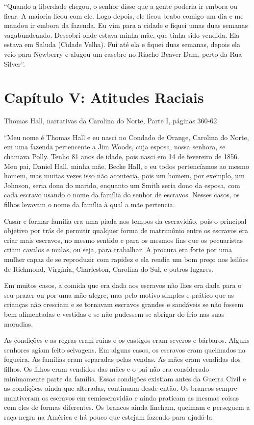 ``Quando a liberdade chegou, o senhor disse que a gente poderia ir
embora ou ficar. A maioria ficou com ele. Logo depois, ele ficou brabo
comigo um dia e me mandou ir embora da fazenda. Eu vim para a cidade e
fiquei umas duas semanas vagabundeando. Descobri onde estava minha mãe,
que tinha sido vendida. Ela estava em Saluda (Cidade Velha). Fui até ela
e fiquei duas semanas, depois ela veio para Newberry e alugou um casebre
no Riacho Beaver Dam, perto da Rua Silver''.

\chapter{Capítulo V: Atitudes Raciais}

Thomas Hall, narrativas da Carolina do Norte, Parte I, páginas 360-62

``Meu nome é Thomas Hall e eu nasci no Condado de Orange, Carolina do
Norte, em uma fazenda pertencente a Jim Woods, cuja esposa, nossa
senhora, se chamava Polly. Tenho 81 anos de idade, pois nasci em 14 de
fevereiro de 1856. Meu pai, Daniel Hall, minha mãe, Becke Hall, e eu
todos pertencíamos ao mesmo homem, mas muitas vezes isso não acontecia,
pois um homem, por exemplo, um Johnson, seria dono do marido, enquanto
um Smith seria dono da esposa, com cada escravo usando o nome da família
do senhor de escravos. Nesses casos, os filhos levavam o nome da família
à qual a mãe pertencia.

Casar e formar família era uma piada nos tempos da escravidão, pois o
principal objetivo por trás de permitir qualquer forma de matrimônio
entre os escravos era criar mais escravos, no mesmo sentido e para os
mesmos fins que os pecuaristas criam cavalos e mulas, ou seja, para
trabalhar. A procura era forte por uma mulher capaz de se reproduzir com
rapidez e ela rendia um bom preço nos leilões de Richmond, Virgínia,
Charleston, Carolina do Sul, e outros lugares.

Em muitos casos, a comida que era dada aos escravos não lhes era dada
para o seu prazer ou por uma mão alegre, mas pelo motivo simples e
prático que as crianças não cresciam e se tornavam escravos grandes e
saudáveis se não fossem bem alimentadas e vestidas e se não pudessem se
abrigar do frio nas suas moradias.

As condições e as regras eram ruins e os castigos eram severos e
bárbaros. Alguns senhores agiam feito selvagens. Em alguns casos, os
escravos eram queimados na fogueira. As famílias eram separadas pelas
vendas. As mães eram vendidas dos filhos. Os filhos eram vendidos das
mães e o pai não era considerado minimamente parte da família. Essas
condições existiam antes da Guerra Civil e as condições, ainda que
alteradas, continuam desde então. Os brancos sempre mantiveram os
escravos em semiescravidão e ainda praticam as mesmas coisas com eles de
formas diferentes. Os brancos ainda lincham, queimam e perseguem a raça
negra na América e há pouco que estejam fazendo para ajudá-la.

